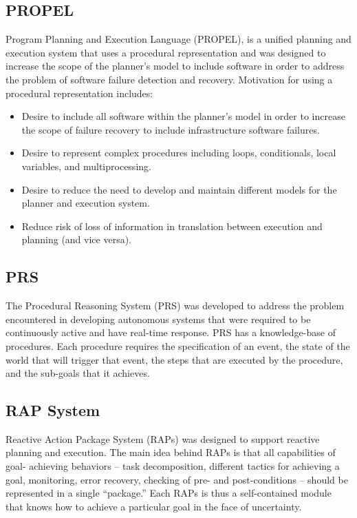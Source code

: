 \documentclass[conference]{IEEEtran}
\begin{document}
\subsection{\textbf{PROPEL}}\label{sec:propel}
Program Planning and Execution Language (PROPEL), is a unified planning and execution system that uses a procedural representation and was designed to increase the scope of the planner’s model to include software in order to address the problem of software failure detection and recovery. Motivation for using a procedural representation includes:
\begin{itemize}
    \item Desire to include all software within the planner’s model in order to increase the scope of failure recovery to include infrastructure software failures.
    \item Desire to represent complex procedures including loops, conditionals, local variables, and multiprocessing.
    \item Desire to reduce the need to develop and maintain different models for the planner and execution system.
    \item Reduce risk of loss of information in translation between execution and planning (and vice versa).
\end{itemize}

\subsection{\textbf{PRS}}\label{sec:prs}
The Procedural Reasoning System (PRS) was developed to address the problem encountered in developing autonomous systems that were required to be continuously active and have real-time response. PRS has a knowledge-base of procedures. Each procedure requires the specification of an event, the state of the world that will trigger that event, the steps that are executed by the procedure, and the sub-goals that it achieves.

\subsection{\textbf{RAP System}}\label{sec:rap}
Reactive Action Package System (RAPs) was designed to support reactive planning and execution. 
The main idea behind RAPs is that all capabilities of goal- achieving behaviors – task decomposition, different tactics for achieving a goal, monitoring, error recovery, checking of pre- and post-conditions – should be represented in a single “package.” Each RAPs is thus a self-contained module that knows how to achieve a particular goal in the face of uncertainty.
\end{document}
